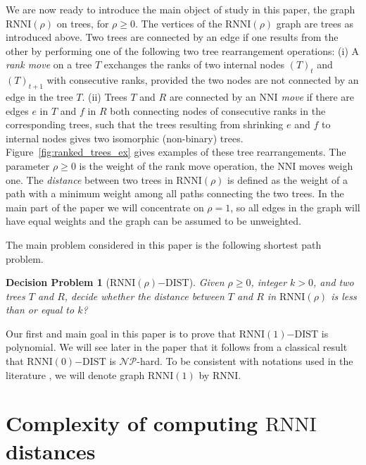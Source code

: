 \documentclass[11pt]{amsart}
\newtheorem*{decision_problem}{Decision Problem}
\newcommand{\rnni}{\mathrm{RNNI}}
\newcommand{\nni}{\mathrm{NNI}}
\newcommand{\np}{\mathcal{NP}}
\newcommand{\summary}[1]{} %
\begin{document}
\summary{Defining graph $\rnni(\rho)$.}
We are now ready to introduce the main object of study in this paper, the graph $\rnni(\rho)$ on trees, for $\rho \geq 0$.
The vertices of the $\rnni(\rho)$ graph are trees as introduced above.
Two trees are connected by an edge if one results from the other by performing one of the following two tree rearrangement operations:
(i) A \emph{rank move} on a tree $T$ exchanges the ranks of two internal nodes $(T)_t$ and $(T)_{t+1}$ with consecutive ranks, provided the two nodes are not connected by an edge in the tree $T$.
(ii) Trees $T$ and $R$ are connected by an \emph{$\nni$ move} if there are edges $e$ in $T$ and $f$ in $R$ both connecting nodes of consecutive ranks in the corresponding trees, such that the trees resulting from shrinking $e$ and $f$ to internal nodes gives two isomorphic (non-binary) trees.
Figure~\ref{fig:ranked_trees_ex} gives examples of these tree rearrangements.
The parameter $\rho \geq 0$ is the weight of the rank move operation, the $\nni$ moves weigh one.
The \emph{distance} between two trees in $\rnni(\rho)$ is defined as the weight of a path with a minimum weight among all paths connecting the two trees.
In the main part of the paper we will concentrate on $\rho = 1$, so all edges in the graph will have equal weights and the graph can be assumed to be unweighted.

The main problem considered in this paper is the following shortest path problem.

\begin{decision_problem}[$\rnni(\rho)\mathrm{-DIST}$] Given $\rho \geq 0$, integer $k > 0$, and two trees $T$ and $R$, decide whether the distance between $T$ and $R$ in $\rnni(\rho)$ is less than or equal to $k$?
\label{problem:rnni_dist}
\end{decision_problem}

Our first and main goal in this paper is to prove that $\rnni(1)\mathrm{-DIST}$ is polynomial.
We will see later in the paper that it follows from a classical result that $\rnni(0)\mathrm{-DIST}$ is $\np$-hard.
To be consistent with notations used in the literature \autocite{Gavryushkin2018-ol, Collienne2019-ca}, we will denote graph $\rnni(1)$ by $\rnni$.


\section{Complexity of computing $\rnni$ distances}
\end{document}
